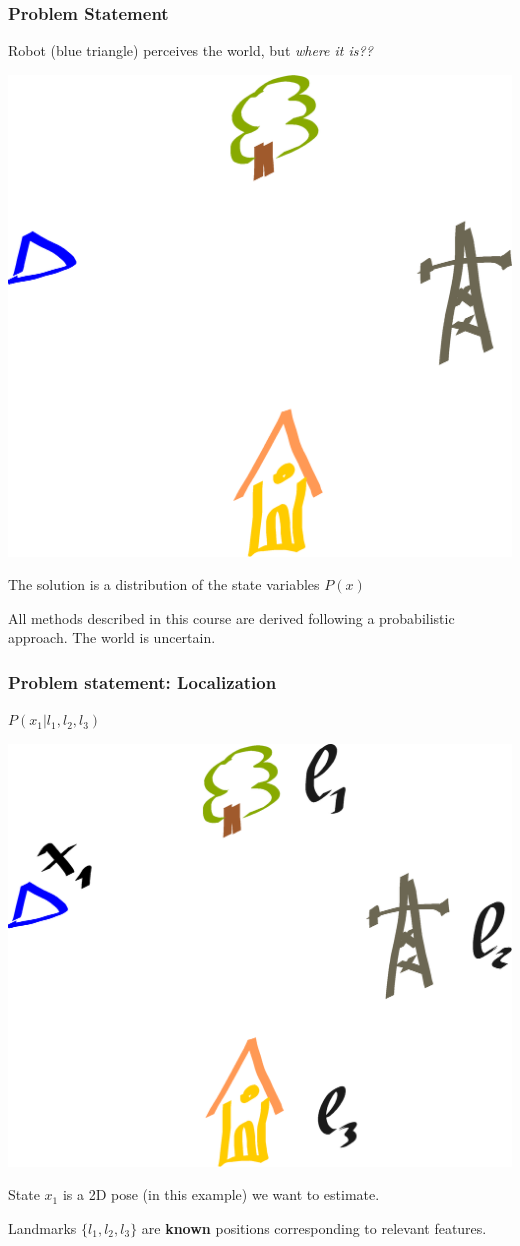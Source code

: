 \documentclass[xetex,mathserif,serif]{beamer} %
\begin{document}
\begin{frame}
\frametitle{Problem Statement}

Robot (blue triangle) perceives the world, but {\em where it is??}
\begin{center}
\includegraphics[width=.5\textwidth]{localization0}
\end{center}



\pause

{\centering
The solution is a distribution of the state variables $P(x)$
}

All methods described in this course are derived following a probabilistic approach. The world is uncertain.

\end{frame}




\begin{frame}
\frametitle{Problem statement: Localization}


$P(x_1 | l_1,l_2,l_3)$

\begin{center}
\includegraphics[width=.5\textwidth]{localization1}
\end{center}

State $x_1$ is a 2D pose (in this example) we want to estimate.

Landmarks $\{l_1,l_2,l_3\}$ are {\bf known} positions corresponding to relevant features.

\end{frame}
\end{document}
